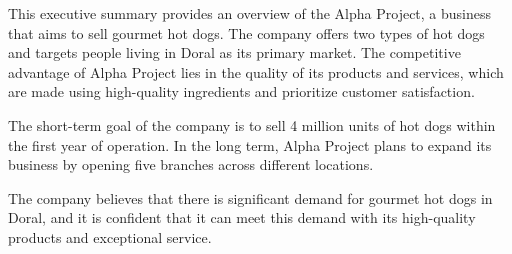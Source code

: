 This executive summary provides an overview of the Alpha Project, a business that aims to sell gourmet hot dogs. The company offers two types of hot dogs and targets people living in Doral as its primary market. The competitive advantage of Alpha Project lies in the quality of its products and services, which are made using high-quality ingredients and prioritize customer satisfaction.

The short-term goal of the company is to sell 4 million units of hot dogs within the first year of operation. In the long term, Alpha Project plans to expand its business by opening five branches across different locations.

The company believes that there is significant demand for gourmet hot dogs in Doral, and it is confident that it can meet this demand with its high-quality products and exceptional service.